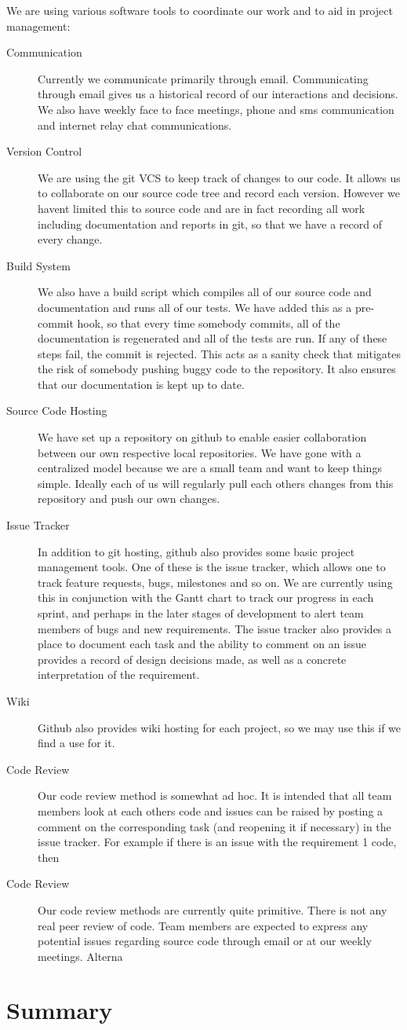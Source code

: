 \documentclass{article}
\begin{document}
We are using various software tools to coordinate our work and to aid in project management:
\begin{description}
  \item[Communication] Currently we communicate primarily through email. Communicating through email gives us a historical record of our interactions and decisions. We also have weekly face to face meetings, phone and sms communication and internet relay chat communications.
  \item[Version Control] We are using the git VCS to keep track of changes to our code. It allows us to collaborate on our source code tree and record each version. However we havent limited this to source code and are in fact recording all work including documentation and reports in git, so that we have a record of every change.
  \item[Build System] We also have a build script which compiles all of our source code and documentation and runs all of our tests. We have added this as a pre-commit hook, so that every time somebody commits, all of the documentation is regenerated and all of the tests are run. If any of these steps fail, the commit is rejected. This acts as a sanity check that mitigates the risk of somebody pushing buggy code to the repository. It also ensures that our documentation is kept up to date.
  \item[Source Code Hosting] We have set up a repository on github to enable easier collaboration between our own respective local repositories. We have gone with a centralized model because we are a small team and want to keep things simple. Ideally each of us will regularly pull each others changes from this repository and push our own changes.
  \item[Issue Tracker] In addition to git hosting, github also provides some basic project management tools. One of these is the issue tracker, which allows one to track feature requests, bugs, milestones and so on. We are currently using this in conjunction with the Gantt chart to track our progress in each sprint, and perhaps in the later stages of development to alert team members of bugs and new requirements. The issue tracker also provides a place to document each task and the ability to comment on an issue provides a record of design decisions made, as well as a concrete interpretation of the requirement.
  \item[Wiki] Github also provides wiki hosting for each project, so we may use this if we find a use for it.
  \item[Code Review] Our code review method is somewhat ad hoc. It is intended that all team members look at each others code and issues can be raised by posting a comment on the corresponding task (and reopening it if necessary) in the issue tracker. For example if there is an issue with the requirement 1 code, then
  \item[Code Review] Our code review methods are currently quite primitive. There is not any real peer review of code. Team members are expected to express any potential issues regarding source code through email or at our weekly meetings. Alterna
\end{description}


\section{Summary}
\end{document}
